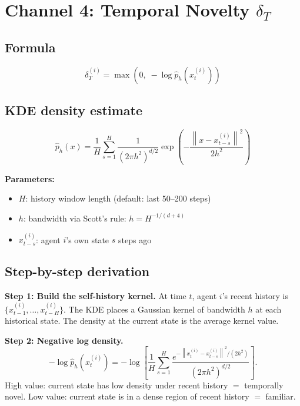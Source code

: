 \documentclass[11pt,a4paper]{article}
\theoremstyle{definition}
\newcommand{\norm}[1]{\left\|#1\right\|}
\begin{document}
\section{Channel 4: Temporal Novelty $\delta_T$}

\subsection{Formula}

\begin{lockedbox}
\[
\delta_T^{(i)} = \max\!\left(0,\; -\log\hat{p}_h(x_t^{(i)})\right)
\]
\end{lockedbox}

\subsection{KDE density estimate}

\begin{lockedbox}
\[
\hat{p}_h(x) = \frac{1}{H}\sum_{s=1}^{H} \frac{1}{(2\pi h^2)^{d/2}}\exp\!\left(-\frac{\norm{x - x_{t-s}^{(i)}}^2}{2h^2}\right)
\]
\end{lockedbox}

\textbf{Parameters:}
\begin{itemize}
\item $H$: history window length (default: last 50--200 steps)
\item $h$: bandwidth via Scott's rule: $h = H^{-1/(d+4)}$
\item $x_{t-s}^{(i)}$: agent $i$'s own state $s$ steps ago
\end{itemize}

\subsection{Step-by-step derivation}

\textbf{Step 1: Build the self-history kernel.}
At time $t$, agent $i$'s recent history is $\{x_{t-1}^{(i)},\dots,x_{t-H}^{(i)}\}$.
The KDE places a Gaussian kernel of bandwidth $h$ at each historical state.
The density at the current state is the average kernel value.

\textbf{Step 2: Negative log density.}
\[
-\log\hat{p}_h(x_t^{(i)}) = -\log\left[\frac{1}{H}\sum_{s=1}^H \frac{e^{-\norm{x_t^{(i)}-x_{t-s}^{(i)}}^2/(2h^2)}}{(2\pi h^2)^{d/2}}\right].
\]
High value: current state has low density under recent history $=$ temporally novel.
Low value: current state is in a dense region of recent history $=$ familiar.
\end{document}
